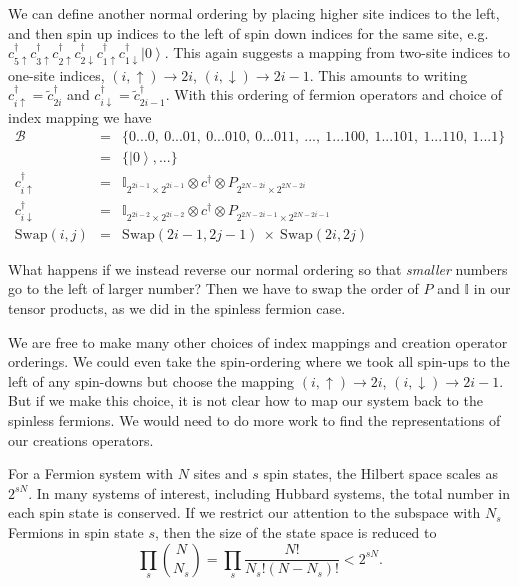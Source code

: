 \documentclass{article}
\newcommand{\ket}[1]{\left| #1 \right>} %
\theoremstyle{definition}
\begin{document}
We can define another normal ordering by placing higher site indices to the left, and then spin up indices to the left of spin down indices for the same site, e.g. $c^\dag_{5\uparrow}c^\dag_{3\uparrow}c^\dag_{2\uparrow}c^\dag_{2\downarrow}c^\dag_{1\uparrow}c^\dag_{1\downarrow} \ket{0}$. This again suggests a mapping from two-site indices to one-site indices, $(i, \uparrow) \rightarrow 2i$, $(i, \downarrow) \rightarrow 2i - 1$. This amounts to writing $c^\dag_{i\uparrow} = \tilde c^\dag_{2i}$ and $c^\dag_{i\downarrow} = \tilde c^\dag_{2i-1}$. With this ordering of fermion operators and choice of index mapping we have
\begin{eqnarray}
\mathcal{B} &=& \{0...0, \ 0...01, \ 0...010, \ 0...011, \ ..., \ 1...100, \ 1...101, \ 1...110, \ 1...1 \}\\
&=& \{\ket{0},...\}\\
c^\dag_{i\uparrow} &=& \mathbb{I}_{2^{2i-1}\times2^{2i-1}}\otimes c^\dag \otimes P_{2^{2N-2i}\times2^{2N-2i}}\\
c^\dag_{i\downarrow} &=& \mathbb{I}_{2^{2i-2}\times2^{2i-2}} \otimes c^\dag \otimes P_{2^{2N-2i-1}\times2^{2N-2i-1}}\\
\text{Swap}(i,j) &=&\text{Swap}(2i-1,2j-1) \ \times \ \text{Swap}(2i,2j)
\end{eqnarray}

What happens if we instead reverse our normal ordering so that \emph{smaller} numbers go to the left of larger number? Then we have to swap the order of $P$ and $\mathbb{I}$ in our tensor products, as we did in the spinless fermion case.

We are free to make many other choices of index mappings and creation operator orderings. We could even take the spin-ordering where we took all spin-ups to the left of any spin-downs but choose the mapping $(i, \uparrow) \rightarrow 2i$, $(i, \downarrow) \rightarrow 2i - 1$. But if we make this choice, it is not clear how to map our system back to the spinless fermions. We would need to do more work to find the representations of our creations operators.

For a Fermion system with $N$ sites and $s$ spin states, the Hilbert space scales as $2^{sN}$. In many systems of interest, including Hubbard systems, the total number in each spin state is conserved. If we restrict our attention to the subspace with $N_s$ Fermions in spin state $s$, then the size of the state space is reduced to 
\begin{equation}
\prod_s{N\choose{N_s}} = \prod_s \frac{N!}{N_s!(N-N_s)!} < 2^{sN}.
\end{equation}
\end{document}
